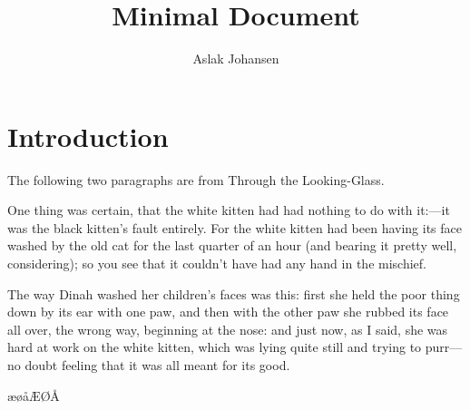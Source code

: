 \documentclass[10pt]{article}
\begin{document}
\title{Minimal Document}
\author{Aslak Johansen}
\maketitle

\section{Introduction}

The following two paragraphs are from Through the Looking-Glass.

One thing was certain, that the white kitten had had nothing to do with it:—it was the black kitten’s fault entirely. For the white kitten had been having its face washed by the old cat for the last quarter of an hour (and bearing it pretty well, considering); so you see that it couldn’t have had any hand in the mischief.

The way Dinah washed her children’s faces was this: first she held the poor thing down by its ear with one paw, and then with the other paw she rubbed its face all over, the wrong way, beginning at the nose: and just now, as I said, she was hard at work on the white kitten, which was lying quite still and trying to purr—no doubt feeling that it was all meant for its good. 

æøåÆØÅ
\end{document}
